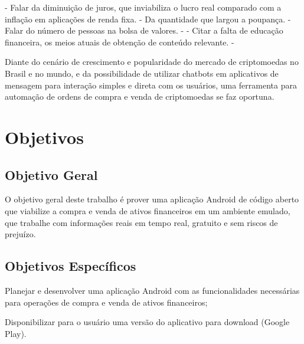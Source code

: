 

- Falar da diminuição de juros, que inviabiliza o lucro real comparado com a inflação em aplicações de renda fixa.
- Da quantidade que largou a poupança.
- Falar do número de pessoas na bolsa de valores.
- 
- Citar a falta de educação financeira, os meios atuais de obtenção de conteúdo relevante.
- 

Diante do cenário de crescimento e popularidade do mercado de criptomoedas no Brasil e no mundo, e da possibilidade de utilizar chatbots em aplicativos de mensagem para interação simples e direta com os usuários, uma ferramenta para automação de ordens de compra e venda de criptomoedas se faz oportuna.

\section{Objetivos}
\subsection{Objetivo Geral}
O objetivo geral deste trabalho é prover uma aplicação Android de código aberto que viabilize a compra e venda de ativos financeiros em um ambiente emulado, que trabalhe com informações reais em tempo real, gratuito e sem riscos de prejuízo.

\subsection{Objetivos Específicos}
\begin{lista}
  \item Planejar e desenvolver uma aplicação Android com as funcionalidades necessárias para operações de compra e venda de ativos financeiros;
  \item Disponibilizar para o usuário uma versão do aplicativo para download (Google Play).
\end{lista}